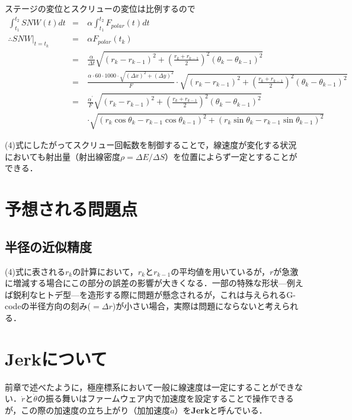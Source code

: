 \documentclass[twocolumn,oneside,a4paper]{article}
\begin{document}
ステージの変位とスクリューの変位は比例するので
\begin{eqnarray}
\int_{t_1}^{t_2} SNW(t)dt &=& \alpha \int_{t_1}^{t_2} F_{polar}(t) dt \nonumber \\
\therefore SNW\big|_{t=t_k} &=& \alpha F_{polar}(t_k)  \nonumber \\
&=& \frac{\alpha}{\Delta t} \sqrt{\left( r_k - r_{k-1} \right)^2 + \left(\frac{r_k+r_{k-1}}{2} \right)^2 \left( \theta_k - \theta_{k-1} \right)^2} \nonumber \\
&=& \frac{\alpha \cdot 60\cdot1000 \cdot \sqrt{(\Delta x)^2+(\Delta y)^2}}{F} \cdot \sqrt{\left( r_k - r_{k-1} \right)^2 + \left(\frac{r_k+r_{k-1}}{2} \right)^2  \left( \theta_k - \theta_{k-1} \right)^2} \nonumber \\
&=& \frac{\alpha^\prime}{F} \sqrt{\left( r_k - r_{k-1} \right)^2 + \left(\frac{r_k+r_{k-1}}{2} \right)^2  \left( \theta_k - \theta_{k-1} \right)^2 }  \nonumber \\
&\quad& \cdot \sqrt{ (r_k \cos\theta_k - r_{k-1} \cos\theta_{k-1})^2+(r_k \sin\theta_k - r_{k-1} \sin\theta_{k-1})^2 }
\end{eqnarray}

(4)式にしたがってスクリュー回転数を制御することで，線速度が変化する状況においても射出量（射出線密度$\rho = \Delta E / \Delta S$）を位置によらず一定とすることができる．

\section{予想される問題点}
\subsection{半径の近似精度} 
(4)式に表される$r_k$の計算において，$r_k$と$r_{k-1}$の平均値を用いているが，$r$が急激に増減する場合にこの部分の誤差の影響が大きくなる．一部の特殊な形状—例えば鋭利なヒトデ型—を造形する際に問題が懸念されるが，これは与えられるG-codeの半径方向の刻み($ = \Delta r$)が小さい場合，実際は問題にならないと考えられる．



\clearpage
\section{Jerkについて}
前章で述べたように，極座標系において一般に線速度は一定にすることができない．$\dot{r}$と$\dot{\theta}$の振る舞いはファームウェア内で加速度を設定することで操作できるが，この際の加速度の立ち上がり（加加速度$\dot{a}$）を{\bf Jerk}と呼んでいる．
\end{document}
